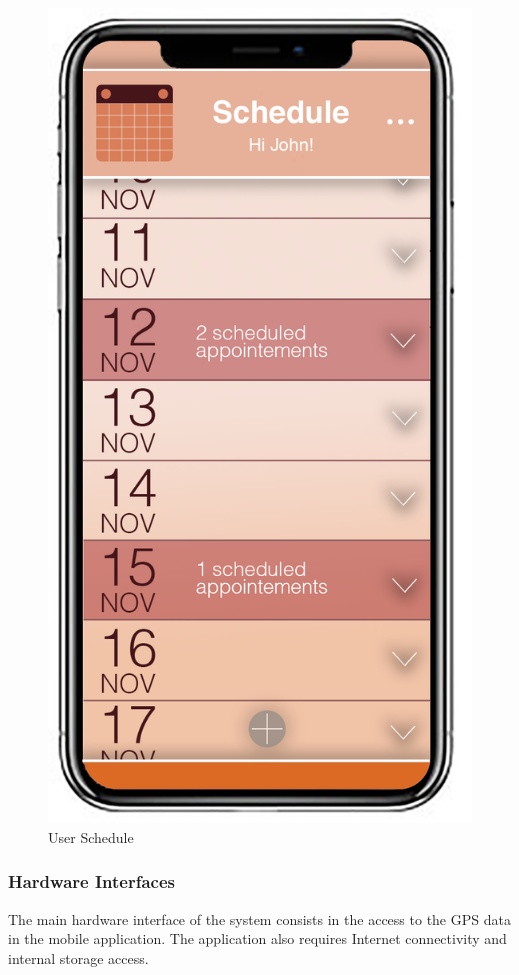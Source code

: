 \begin{figure}[H]
\begin{minipage}{0.33\textwidth}
				\centerline{\includegraphics[scale=0.4]{Images/UserSchedule}}
				\caption{User Schedule}
			\end{minipage}
		\end{figure}

	\subsubsection{Hardware Interfaces}
	The main hardware interface of the system consists in the access to the GPS data
	in the mobile application. The application also requires Internet connectivity
	and internal storage access.
	
